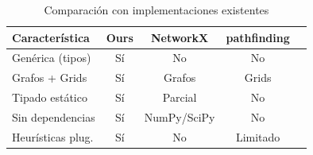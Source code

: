 \begin{table}[H]
\centering
\caption{Comparación con implementaciones existentes}
\label{tab:related}
\renewcommand{\arraystretch}{1.2}
\begin{tabular}{@{}lcccc@{}}
\toprule
\textbf{Característica} & \textbf{Ours} & \textbf{NetworkX} & \textbf{pathfinding} \\
\midrule
Genérica (tipos) & Sí & No & No \\
Grafos + Grids & Sí & Grafos & Grids \\
Tipado estático & Sí & Parcial & No \\
Sin dependencias & Sí & NumPy/SciPy & No \\
Heurísticas plug. & Sí & No & Limitado \\
\bottomrule
\end{tabular}
\end{table}
